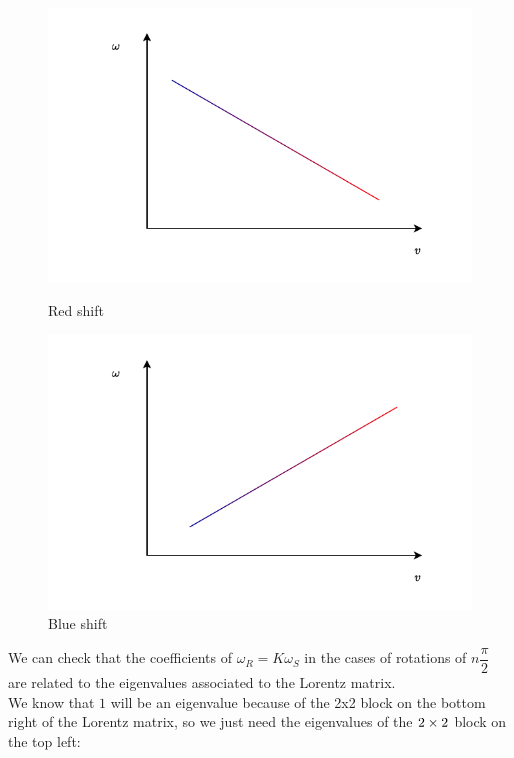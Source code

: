 \begin{figure}[H]
    \begin{minipage}{0.5\textwidth}
     \centering
     \includegraphics[width=1\linewidth]{res/svg/Doppler_redshift.drawio}
     \caption{Red shift}
   \end{minipage}\hfill
   \begin{minipage}{0.5\textwidth}
     \centering
     \includegraphics[width=1\linewidth]{res/svg/Doppler_blueshift.drawio}
     \caption{Blue shift}
   \end{minipage}
\end{figure}
\STOP We can check that the coefficients of $\omega_R = K\omega_S$ in the cases of rotations of $n\dfrac{\pi}{2}$ are related to the eigenvalues associated to the Lorentz matrix.\\
We know that $1$ will be an eigenvalue because of the 2x2 block on the bottom right of the Lorentz matrix, so we just need the eigenvalues of the $2 \times 2$ block on the top left:
